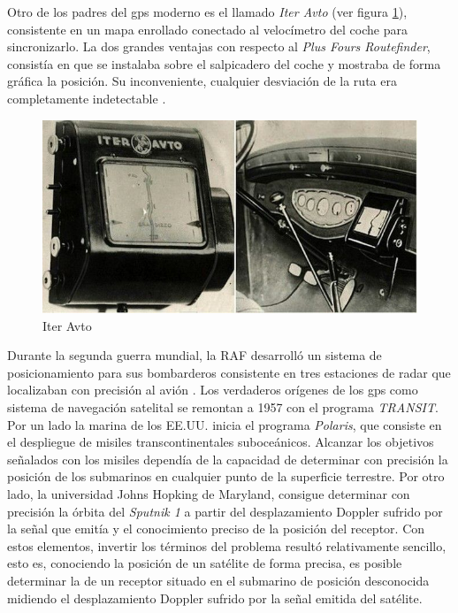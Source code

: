 Otro de los padres del gps moderno es el llamado \textit{Iter Avto} (ver figura \ref{fig:iter_avto}), consistente en un mapa enrollado conectado al velocímetro del coche para sincronizarlo. La dos grandes ventajas con respecto al \textit{Plus Fours Routefinder}, consistía en que se instalaba sobre el salpicadero del coche y mostraba de forma gráfica la posición. Su inconveniente, cualquier desviación de la ruta era completamente indetectable \cite{Parra13}.

\begin{figure}[h!btp]
\centering
\includegraphics[scale=0.5, fbox={\fboxrule} 4mm]{images/03-antecedentes/08-iter_avto.png}
\caption{Iter Avto}
\label{fig:iter_avto}
\end{figure}

Durante la segunda guerra mundial, la \ac{RAF} desarrolló un sistema de
posicionamiento para sus bombarderos consistente en tres estaciones de radar que localizaban
con precisión al avión \cite{Ori13}. 
Los verdaderos orígenes de los gps como sistema de navegación satelital se remontan a 1957 con
el programa \textit{TRANSIT}. Por un lado la marina de los \ac{EE.UU.} inicia el programa \textit{Polaris},
que consiste en el despliegue de misiles transcontinentales suboceánicos. Alcanzar los objetivos señalados
con los misiles dependía de la capacidad de determinar con precisión la posición de los
submarinos en cualquier punto de la superficie terrestre. Por otro lado, la universidad Johns
Hopking de Maryland, consigue determinar con precisión la órbita del \textit{Sputnik 1} a partir del
desplazamiento Doppler sufrido por la señal que emitía y el conocimiento preciso de la posición
del receptor. Con estos elementos, invertir los términos del problema resultó relativamente
sencillo, esto es, conociendo la posición de un satélite de forma precisa, es posible determinar
la de un receptor situado en el submarino de posición desconocida midiendo el desplazamiento
Doppler sufrido por la señal emitida del satélite.

